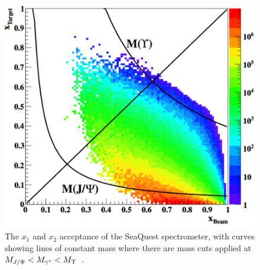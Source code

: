 \begin{figure}
	\centering
	\includegraphics[height=0.45\textheight]{figures/background/x1-x2-acceptance.png}
	\caption{The $x_1$ and $x_2$ acceptance of the SeaQuest spectrometer, with curves showing lines of constant mass where there are mass cuts applied at $M_{J/\Psi} < M_{\gamma^*} <M_\Upsilon$~\cite{sanftl:2014}.}
	\label{fig:x1-x2-acceptance}
\end{figure}